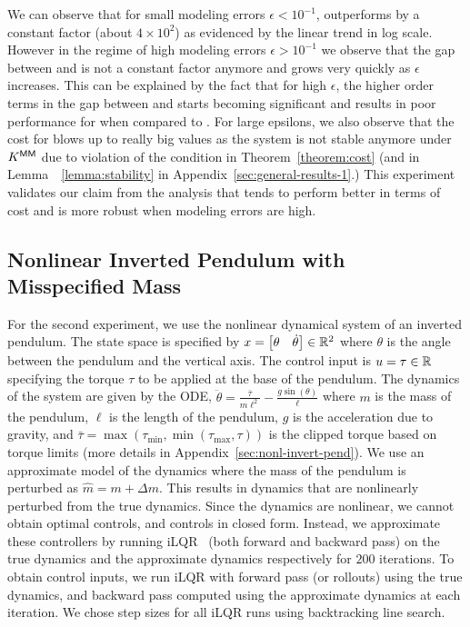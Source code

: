 We can observe that for small modeling errors $\epsilon < 10^{-1}$, \ILC{}
outperforms \MM{} by a constant factor (about $4\times 10^{2}$) as evidenced by the linear
trend in log scale. However in the regime of high modeling errors
$\epsilon > 10^{-1}$ we observe that the gap between \ILC{} and \MM{} is not a
constant factor anymore and grows very quickly as $\epsilon$ increases. This can
be explained by the fact that for high $\epsilon$, the
higher order terms in the gap between \ILC{} and \MM{} starts becoming significant
and results in poor performance for \MM{} when compared to \ILC{}. For large epsilons,
we also observe that the cost for \MM{} blows up to really big values as the system
is not stable anymore under $K^\mathsf{MM}$ due to violation of the condition
in Theorem~\ref{theorem:cost} (and in
Lemma~~\ref{lemma:stability} in Appendix~\ref{sec:general-results-1}.) This experiment validates our claim from the
analysis that \ILC{} tends to perform better in terms of cost and is more robust
when modeling errors are high.

\subsection{Nonlinear Inverted Pendulum with Misspecified Mass}
\label{sec:invert-pend-with}

For the second experiment, we use the nonlinear dynamical system of an inverted
pendulum. The state space is specified by $x =
\begin{bmatrix}
  \theta &
  \dot{\theta}
\end{bmatrix} \in \mathbb{R}^{2}
$ where $\theta$ is the angle between the pendulum and the vertical axis. The
control input is $u = \tau \in \mathbb{R}$ specifying the torque $\tau$ to be
applied at the base of the pendulum. The dynamics of the system are
given by the ODE,
$\ddot{\theta} = \frac{\bar{\tau}}{m\ell^{2}} - \frac{g\sin(\theta)}{\ell}$
where $m$ is the mass of the pendulum, $\ell$ is the length of the pendulum, $g$
is the acceleration due to gravity, and
$\bar{\tau} = \max(\tau_{\min}, \min(\tau_{\max}, \tau))$ is the clipped torque
based on torque limits (more details in
Appendix~\ref{sec:nonl-invert-pend}).
We use an approximate model of the dynamics where the mass of the pendulum is
perturbed as $\hat{m} = m + \Delta m$.
This results in dynamics that are nonlinearly perturbed from the true dynamics.
Since the dynamics are nonlinear, we cannot obtain
optimal controls, and \MM{} controls in closed form. Instead, we approximate these
controllers by running iLQR~\cite{li04} (both forward and backward pass) on the
true dynamics and the approximate
dynamics respectively for $200$ iterations. To obtain \ILC{} control inputs, we run
iLQR with forward pass (or rollouts)
using the true dynamics, and backward pass computed using the approximate
dynamics at each iteration.
We chose step sizes for all iLQR runs using
backtracking line search.

